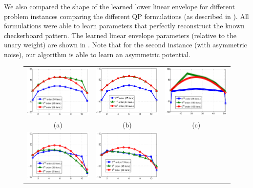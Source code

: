 \documentclass[10pt,journal,letterpaper,compsoc]{IEEEtran}
\begin{document}
We also compared the shape of the learned lower linear envelope for
different problem instances comparing the different QP formulations
(as described in ). All formulations were
able to learn parameters that perfectly reconstruct the known
checkerboard pattern. The learned linear envelope parameters (relative
to the unary weight) are shown in . Note
that for the second instance (with asymmetric noise), our algorithm is
able to learn an asymmetric potential.

\begin{figure}[t]
  \centering
  \setlength{\tabcolsep}{2pt}
  \begin{tabular}{ccc}
    \includegraphics[width=0.32\linewidth]{figures/synthenv1} &
    \includegraphics[width=0.32\linewidth]{figures/synthenv5} &
    \includegraphics[width=0.32\linewidth]{figures/synthenv2} \\
    {\small (a)} & {\small (b)} & {\small (c)} \\
    \includegraphics[width=0.32\linewidth]{figures/synthenv3} &
    \includegraphics[width=0.32\linewidth]{figures/synthenv6} &

\end{tabular}
\end{figure}
\end{document}
